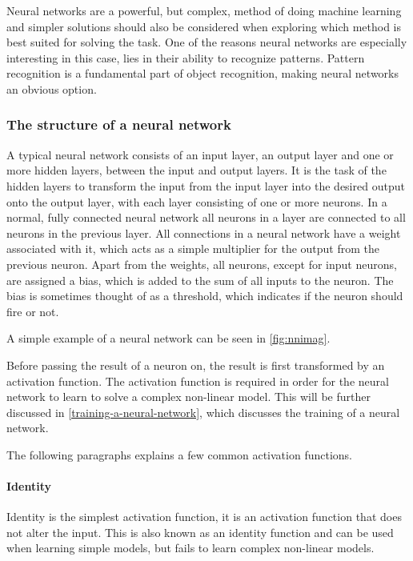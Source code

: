 Neural networks are a powerful, but complex, method of doing machine learning and simpler solutions should also be considered when exploring which method is best suited for solving the task.
One of the reasons neural networks are especially interesting in this case, lies in their ability to recognize patterns.
Pattern recognition is a fundamental part of object recognition, making neural networks an obvious option.

\subsubsection{The structure of a neural network}
A typical neural network consists of an input layer, an output layer and one or more hidden layers, between the input and output layers.
It is the task of the hidden layers to transform the input from the input layer into the desired output onto the output layer, with each layer consisting of one or more neurons.
In a normal, fully connected neural network all neurons in a layer are connected to all neurons in the previous layer.
All connections in a neural network have a weight associated with it, which acts as a simple multiplier for the output from the previous neuron. 
Apart from the weights, all neurons, except for input neurons, are assigned a bias, which is added to the sum of all inputs to the neuron. 
The bias is sometimes thought of as a threshold, which indicates if the neuron should fire or not.

A simple example of a neural network can be seen in \autoref{fig:nnimag}.


Before passing the result of a neuron on, the result is first transformed by an activation function. 
The activation function is required in order for the neural network to learn to solve a complex non-linear model. 
This will be further discussed in \autoref{training-a-neural-network}, which discusses the training of a neural network.

The following paragraphs explains a few common activation functions.
\paragraph{Identity}
Identity is the simplest activation function, it is an activation function that does not alter the input. 
This is also known as an identity function and can be used when learning simple models, but fails to learn complex non-linear models.

